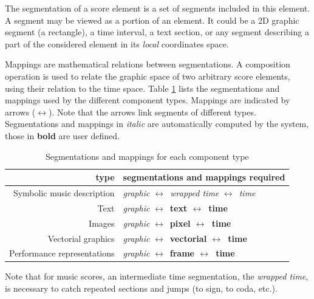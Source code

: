\documentclass[11pt,letterpaper]{article}
\newcommand{\lra}			{$\leftrightarrow$}
\begin{document}
The segmentation of a score element is a set of segments included in this element. A segment may be viewed as a portion of an element. It could be a 2D graphic segment (a rectangle), a time interval, a text section, or any segment describing a part of the considered element in its \emph{local} coordinates space.

Mappings are mathematical relations between segmentations. A composition operation is used to relate the graphic space of two arbitrary score elements, using their relation to the time space. 
Table \ref{maptable} lists the segmentations and mappings used by the different component types. Mappings are indicated by arrows (\lra). Note that the arrows link segments of different types. Segmentations and mappings in  \textit{italic} are automatically computed by the system, those in \textbf{bold} are user defined. 


\begin{table}[ht]
\begin{center}
\begin{tabular}{|r|l|}
\hline
type & segmentations and mappings required \\
\hline
Symbolic music description		& \textit{graphic \lra\ wrapped time} \lra\ \textit{time} \\
Text		& \textit{graphic} \lra\ \textbf{text  \lra\ time} \\
Images		& \textit{graphic} \lra\ \textbf{pixel \lra\ time} \\
Vectorial graphics	&  \textit{graphic} \lra\ \textbf{vectorial \lra\ time} \\
Performance representations		&  \textit{graphic} \lra\ \textbf{frame \lra\ time} \\
\hline
\end{tabular}
\end{center}
\caption{Segmentations and mappings for each component type}
\label{maptable}
\end{table}


Note that for music scores, an intermediate time segmentation, the \emph{wrapped time}, is necessary to catch repeated sections and jumps (to sign, to coda, etc.).
\end{document}
